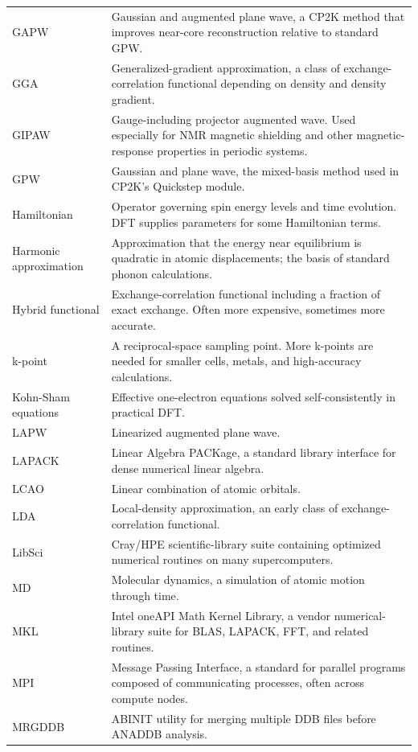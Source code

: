 \documentclass[11pt]{article}
\begin{document}
\begin{longtable}{@{}L{0.18\textwidth}L{0.76\textwidth}@{}}
GAPW & Gaussian and augmented plane wave, a CP2K method that improves near-core reconstruction relative to standard GPW. \\
GGA & Generalized-gradient approximation, a class of exchange-correlation functional depending on density and density gradient. \\
GIPAW & Gauge-including projector augmented wave.  Used especially for NMR magnetic shielding and other magnetic-response properties in periodic systems. \\
GPW & Gaussian and plane wave, the mixed-basis method used in CP2K's Quickstep module. \\
Hamiltonian & Operator governing spin energy levels and time evolution.  DFT supplies parameters for some Hamiltonian terms. \\
Harmonic approximation & Approximation that the energy near equilibrium is quadratic in atomic displacements; the basis of standard phonon calculations. \\
Hybrid functional & Exchange-correlation functional including a fraction of exact exchange.  Often more expensive, sometimes more accurate. \\
k-point & A reciprocal-space sampling point.  More k-points are needed for smaller cells, metals, and high-accuracy calculations. \\
Kohn-Sham equations & Effective one-electron equations solved self-consistently in practical DFT. \\
LAPW & Linearized augmented plane wave. \\
LAPACK & Linear Algebra PACKage, a standard library interface for dense numerical linear algebra. \\
LCAO & Linear combination of atomic orbitals. \\
LDA & Local-density approximation, an early class of exchange-correlation functional. \\
LibSci & Cray/HPE scientific-library suite containing optimized numerical routines on many supercomputers. \\
MD & Molecular dynamics, a simulation of atomic motion through time. \\
MKL & Intel oneAPI Math Kernel Library, a vendor numerical-library suite for BLAS, LAPACK, FFT, and related routines. \\
MPI & Message Passing Interface, a standard for parallel programs composed of communicating processes, often across compute nodes. \\
MRGDDB & ABINIT utility for merging multiple DDB files before ANADDB analysis. \\

\end{longtable}
\end{document}

